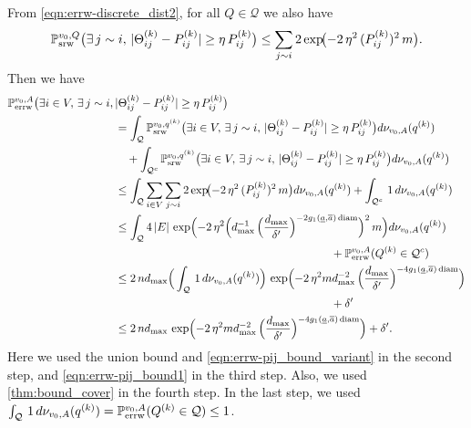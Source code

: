 \documentclass[a4paper, 11pt]{article}
\renewcommand{\P}{\mathbb{P}}
\newcommand{\Psrw}{\P_{\textnormal{srw}}}
\newcommand{\Perrw}{\P_{\textnormal{errw}}}
\newcommand{\diam}{\textnormal{diam}}
\begin{document}
From \cref{eqn:errw-discrete_dist2}, for all $Q \in \mathcal{Q}$ we also have
\begin{equation}
\label{eqn:errw-pij_bound_variant}
\Psrw^{v_0,Q}\bigl(\exists\,j\sim i,\, \lvert \Theta_{ij}^{(k)} - P_{ij}^{(k)}\rvert 
            \ge \eta \, P_{ij}^{(k)}\bigr)
  \le \sum_{j\sim i} 2 \exp\!\bigl(-2\,\eta^2\,(P_{ij}^{(k)})^2\,m\bigr).
\end{equation}
Then we have
\begin{align}
\label{eqn:errw-core1}
  \Perrw^{v_0,A}\bigl(\exists i\in V,\,\exists\,j\sim i,\, & \lvert \Theta_{ij}^{(k)} - P_{ij}^{(k)}\rvert 
            \ge\eta \, P_{ij}^{(k)}\bigr)\nonumber \\
  &= \int_{\mathcal{Q}}\Psrw^{v_0,q^{(k)}}\bigl(\exists i\in V,\, \exists\,j\sim i,\, \lvert \Theta_{ij}^{(k)} - P_{ij}^{(k)}\rvert 
            \ge \eta \, P_{ij}^{(k)}\bigr) d\nu_{v_0,A}(q^{(k)}) \nonumber \\
  & \hspace{1em} + \int_{\mathcal{Q}^c}\Psrw^{v_0,q^{(k)}}\bigl(\exists i\in V,\, \exists\,j\sim i,\, \lvert \Theta_{ij}^{(k)} - P_{ij}^{(k)}\rvert 
            \ge \eta \, P_{ij}^{(k)}\bigr) d\nu_{v_0,A}(q^{(k)})\nonumber \\
  &\le \int_{\mathcal{Q}} \sum_{i\in V}\sum_{j\sim i} 2 \exp\!\bigl(-2\,\eta^2\,(P_{ij}^{(k)})^2\,m\bigr) d\nu_{v_0,A}(q^{(k)}) + \int_{\mathcal{Q}^c} \,1\, d\nu_{v_0,A}(q^{(k)})\nonumber \\
  & \le \int_{\mathcal{Q}} 4\,|E| \,\exp\Bigl(-2\,\eta^2 
      \Big(d_{\max}^{-1}\,\Big(\frac{d_{\max}}{\delta'}\Big)^{-2g_1(\underline{a},\overline{a})\,\diam}\Big)^2 
      \,m \Bigr) d\nu_{v_0,A}(q^{(k)}) \nonumber \\
  & \hspace{19em} + \Perrw^{v_0,A}(Q^{(k)}\in\mathcal{Q}^c)\nonumber \\
  & \leq 2\,nd_{\max} \Big(\int_{\mathcal{Q}}\,1\,d\nu_{v_0,A}(q^{(k)})\Big) \,\exp\Bigl(-2\,\eta^2 m 
      d_{\max}^{-2}\,\Big(\frac{d_{\max}}{\delta'}\Big)^{-4g_1(\underline{a},\overline{a})\,\diam}  \Bigr)\nonumber \\
  & \hspace{19em} + \delta'\nonumber \\
  & \le 2\,nd_{\max} \,\exp\Bigl(-2\,\eta^2 m 
      d_{\max}^{-2}\,\Big(\frac{d_{\max}}{\delta'}\Big)^{-4g_1(\underline{a},\overline{a})\,\diam}  \Bigr) + \delta'.
\end{align}
Here we used the union bound and \cref{eqn:errw-pij_bound_variant} in the second step, and \cref{eqn:errw-pij_bound1} in the third step. Also, we used \cref{thm:bound_cover} in the fourth step. In the last step, we used $\int_{\mathcal{Q}}\,1\,d\nu_{v_0,A}(q^{(k)})=\Perrw^{v_0,A}(Q^{(k)}\in\mathcal{Q})\leq 1$. 
\end{document}
